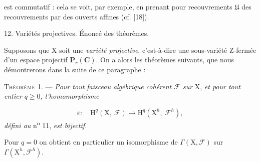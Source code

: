 \begin{center}
\end{center}
est commutatif : cela se voit, par exemple, en prenant pour recouvrements $\mathfrak{U}$ des recouvrements par des ouverts affines (cf. [18]).


12. Variétés projectives. Énoncé des théorèmes.

Supposons que $\mathrm{X}$ soit une \textit{variété projective}, c'est-à-dire une sous-variété $\mathrm{Z}$-fermée d'un espace projectif $\mathbf{P}_r(\mathbf{C})$. On a alors les théorèmes suivants, que nous démontrerons dans la suite de ce paragraphe :

\textsc{Théorème} 1. --- \textit{Pour tout faisceau algébrique cohérent $\mathcal{F}$ sur} $\mathrm{X}$, \textit{et pour tout entier $q \geqslant 0$, l'homomorphisme}

\begin{equation*}
\varepsilon : \quad \mathrm{H}^q(\mathrm{X},\ \mathcal{F}) \longrightarrow \mathrm{H}^q(\mathrm{X}^h,\ \mathcal{F}^h),
\end{equation*}
\textit{défini au} n\textsuperscript{o} 11, \textit{est bijectif.}

Pour $q = 0$ on obtient en particulier un isomorphisme de $\Gamma(\mathrm{X}, \mathcal{F})$ sur $\Gamma(\mathrm{X}^h, \mathcal{F}^h)$.

